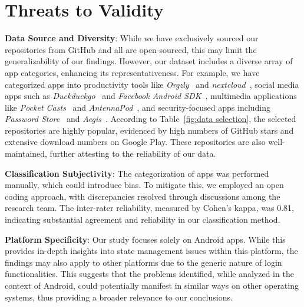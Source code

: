 \section{Threats to Validity}

\textbf{Data Source and Diversity}: While we have exclusively sourced our repositories from GitHub and all are open-sourced, this may limit the generalizability of our findings. However, our dataset includes a diverse array of app categories, enhancing its representativeness. For example, we have categorized apps into productivity tools like \textit{Orgzly}~\cite{orgzly} and \textit{nextcloud}~\cite{nextcloud-android}, social media apps such as \textit{Duckduckgo}~\cite{duckduckgo} and \textit{Facebook Android SDK}~\cite{facebook-android-sdk}, multimedia applications like \textit{Pocket Casts}~\cite{pocket-casts-android} and \textit{AntennaPod}~\cite{AntennaPod}, and security-focused apps including \textit{Password Store}~\cite{Password-Store} and \textit{Aegis}~\cite{Aegis}. According to Table~\ref{fig:data selection}, the selected repositories are highly popular, evidenced by high numbers of GitHub stars and extensive download numbers on Google Play. These repositories are also well-maintained, further attesting to the reliability of our data.

\textbf{Classification Subjectivity}: The categorization of apps was performed manually, which could introduce bias. To mitigate this, we employed an open coding approach, with discrepancies resolved through discussions among the research team. The inter-rater reliability, measured by Cohen’s kappa, was 0.81, indicating substantial agreement and reliability in our classification method.


\textbf{Platform Specificity}: Our study focuses solely on Android apps. While this provides in-depth insights into state management issues within this platform, the findings may also apply to other platforms due to the generic nature of login functionalities. This suggests that the problems identified, while analyzed in the context of Android, could potentially manifest in similar ways on other operating systems, thus providing a broader relevance to our conclusions.


